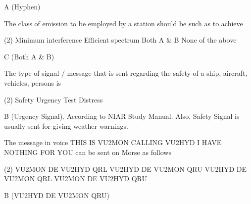 \documentclass[a4paper]{article}
\begin{document}
\begin{solution}
	A (Hyphen)
\end{solution}

\vspace{5mm}



\begin{question}The class of emission to be employed by a station should be such as to achieve
	\begin{tasks}(2)
		\task Minimum interference
		\task Efficient spectrum
		\task Both A \& B
		\task None of the above
	\end{tasks}
\end{question}

\begin{solution}
	C (Both A \& B)
\end{solution}

\vspace{5mm}



\begin{question}The type of signal / message that is sent regarding the safety of a ship, aircraft, vehicles, persons is
	\begin{tasks}(2)
		\task Safety
		\task Urgency
		\task Test
		\task Distress
	\end{tasks}
\end{question}

\begin{solution}
	B (Urgency Signal). According to \apostrophe{}NIAR Study Manual\apostrophe{}. Also, \apostrophe{}Safety Signal\apostrophe{} is usually sent for giving weather warnings.
\end{solution}

\vspace{5mm}



\begin{question}The message in voice \apostrophe{}THIS IS VU2MON CALLING VU2HYD I HAVE NOTHING FOR YOU\apostrophe{} can be sent on Morse as follows
	\begin{tasks}(2)
		\task VU2MON DE VU2HYD QRL
		\task VU2HYD DE VU2MON QRU
		\task VU2HYD DE VU2MON QRL
		\task VU2MON DE VU2HYD QRU
	\end{tasks}
\end{question}

\begin{solution}
	B (VU2HYD DE VU2MON QRU)
\end{solution}
\end{document}
